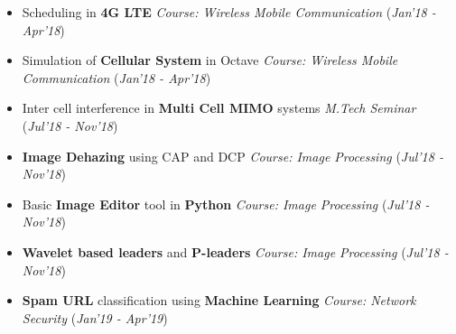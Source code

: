 \documentclass[10pt]{article}
\begin{document}
\colorbox{bl}{}
\vspace{-0.5cm}
\begin{itemize}[leftmargin=0.4cm]


	
\item {Scheduling in \textbf{4G LTE }}\textpipe \hspace{0.2cm} \textit{Course: Wireless Mobile Communication}
\hfill{(\textit{Jan'18 - Apr'18})}\\
\vspace{-0.7cm}
	
	
\item {Simulation of \textbf{Cellular System} in Octave }\textpipe \hspace{0.2cm} \textit{Course: Wireless Mobile Communication}
\hfill{(\textit{Jan'18 - Apr'18})}\\
\vspace{-0.7cm}

\item {Inter cell interference in \textbf{Multi Cell MIMO} systems } \textpipe \hspace{0.2cm} \textit{M.Tech Seminar}
\hfill{(\textit{Jul'18 - Nov'18})}\\
\vspace{-0.7cm}

\item {\textbf{Image Dehazing} using CAP and DCP } \textpipe \hspace{0.2cm} \textit{Course: Image Processing}
\hfill{(\textit{Jul'18 - Nov'18})}\\
\vspace{-0.7cm}

\item {Basic \textbf{Image Editor} tool in \textbf{Python} } \textpipe \hspace{0.2cm} \textit{Course: Image Processing} 
\hfill{(\textit{Jul'18 - Nov'18})}\\
\vspace{-0.7cm}

\item {\textbf{Wavelet based leaders} and \textbf{P-leaders}  }  \textpipe \hspace{0.2cm} \textit{Course: Image Processing}
\hfill{(\textit{Jul'18 - Nov'18})}\\
\vspace{-0.7cm}

\item {\textbf{Spam URL} classification using \textbf{Machine Learning} } \textpipe \hspace{0.2cm} \textit{Course: Network Security}
\hfill{(\textit{Jan'19 - Apr'19})}\\
\vspace{-0.5cm}



\end{itemize}
\end{document}
